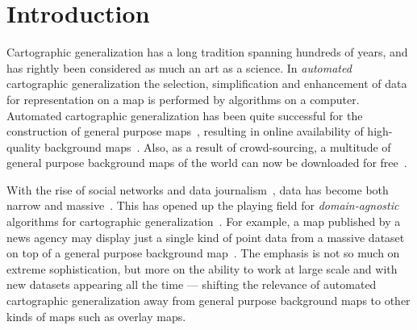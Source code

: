 \section{Introduction}






Cartographic generalization has a long tradition spanning hundreds of years, and has rightly been considered as much an art as a science. In \emph{automated} cartographic generalization the selection, simplification and enhancement of data for representation on a map is performed by algorithms on a computer. Automated cartographic generalization has been quite successful for the construction of general purpose maps~\cite{areaagg,ordnance,another}, resulting in online availability of high-quality background maps~\cite{bing,google,osm}. Also, as a result of crowd-sourcing, a multitude of general purpose background maps of the world can now be downloaded for free~\cite{openstreetmap,googlemaps,bingmaps}. 

With the rise of social networks and data journalism~\cite{datajournalism}, data has become both narrow and massive~\cite{twitter,datablog}. This has opened up the playing field for \emph{domain-agnostic} algorithms for cartographic generalization~\cite{fusiontables,samet}. For example, a map published by a news agency may display just a single kind of point data from a massive dataset on top of a general purpose background map~\cite{iraq}. The emphasis is not so much on extreme sophistication, but more on the ability to work at large scale and with new datasets appearing all the time  --- shifting the relevance of automated cartographic generalization away from general purpose background maps to other kinds of maps such as overlay maps.


